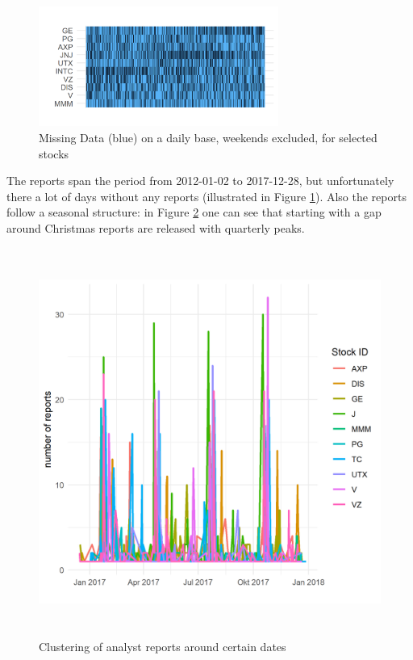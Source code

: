 \begin{figure}[h!]
\centering
\includegraphics[width=0.7\textwidth]{figures/MissingDaysPlot.png}
\caption{Missing Data (blue) on a daily base, weekends excluded, for selected stocks}
\label{fig:MissingDays}
\end{figure}
The reports span the period from 2012-01-02 to 2017-12-28, but unfortunately there a lot of days without any reports (illustrated in Figure \ref{fig:MissingDays}). Also the reports follow a seasonal structure: in Figure \ref{fig:ClusterReport} one can see that starting with a gap around Christmas reports are released with quarterly peaks.

\begin{figure}[h!]
\centering
\begin{adjustbox}{width=0.75\textwidth,center, scale={1}{0.9}}
\includegraphics[width=\textwidth, height= 5in]{figures/SeasonalityReports.png}
\end{adjustbox}
\caption{Clustering of analyst reports around certain dates}
\label{fig:ClusterReport}
\end{figure}

